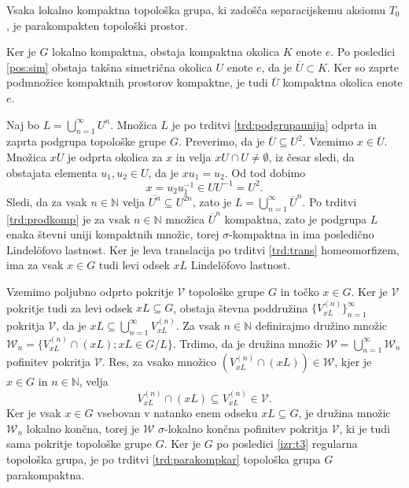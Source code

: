 \documentclass[mat1]{fmfdelo}
\newcommand{\N}{\mathbb N}
\newcommand{\closure}[1]{\overline{#1}}
\begin{document}
\begin{izrek}\label{izr:t4}
	Vsaka lokalno kompaktna topološka grupa, ki zadošča separacijskemu aksiomu $T_0$, je parakompakten topološki prostor.
\end{izrek}

\begin{dokaz}
Ker je $G$ lokalno kompaktna, obstaja kompaktna okolica $K$ enote $e$. Po posledici \ref{pos:sim} obstaja takšna simetrična okolica $U$ enote $e$, da je $\closure{U} \subset K$. Ker so zaprte podmnožice kompaktnih prostorov kompaktne, je tudi $\closure{U}$ kompaktna okolica enote $e$.

Naj bo $L = \bigcup_{n=1}^\infty U^n$. Množica $L$ je po trditvi \ref{trd:podgrupaunija} odprta in zaprta podgrupa topološke grupe $G$.
Preverimo, da je $\closure{U} \subseteq U^2$. Vzemimo $x \in \closure{U}$. Množica $xU$ je odprta okolica za $x$ in velja $xU \cap U \neq \emptyset$, iz česar sledi, da obstajata elementa $u_1,u_2 \in U$, da je $xu_1 = u_2$. Od tod dobimo
\[ x = u_2u_1^{-1} \in UU^{-1} = U^2. \]
Sledi, da za vsak $n \in \N$ velja $\closure{U^n} \subseteq U^{2n}$, zato je $L = \bigcup_{n=1}^\infty \closure{U}^n$. Po trditvi \ref{trd:prodkomp} je za vsak $n \in \N$ množica $\closure{U}^n$ kompaktna, zato je podgrupa $L$ enaka števni uniji kompaktnih množic, torej $\sigma$-kompaktna in ima posledično Lindel\"ofovo lastnost. Ker je leva translacija po trditvi \ref{trd:trans} homeomorfizem, ima za vsak $x \in G$ tudi levi odsek $xL$ Lindel\"ofovo lastnost.

Vzemimo poljubno odprto pokritje $\mathcal{V}$ topološke grupe $G$ in točko $x \in G$.
Ker je $\mathcal{V}$ pokritje tudi za levi odsek $xL \subseteq G$, obstaja števna poddružina $\lbrace V_{xL}^{(n)} \rbrace_{n = 1}^{\infty}$ pokritja $\mathcal{V}$, da je $xL \subseteq \bigcup_{n=1}^{\infty}V_{xL}^{(n)}$. Za vsak $n \in \N$ definirajmo družino množic $\mathcal{W}_n = \lbrace V_{xL}^{(n)} \cap (xL) ; xL \in G/L \rbrace$.
Trdimo, da je družina množic $\mathcal{W} = \bigcup_{n=1}^{\infty}\mathcal{W}_n$ pofinitev pokritja $\mathcal{V}$. Res, za vsako množico $(V_{xL}^{(n)} \cap (xL)) \in \mathcal{W}$, kjer je $x \in G$ in $n \in \N$, velja
\[ V_{xL}^{(n)} \cap (xL) \subseteq V_{xL}^{(n)} \in \mathcal{V}. \]
Ker je vsak $x \in G$ vsebovan v natanko enem odseku $xL \subseteq G$, je družina množic $\mathcal{W}_n$ lokalno končna, torej je $\mathcal{W}$ $\sigma$-lokalno končna pofinitev pokritja $\mathcal{V}$, ki je tudi sama pokritje topološke grupe $G$. Ker je $G$ po posledici \ref{izr:t3} regularna topološka grupa, je po trditvi \ref{trd:parakompkar} topološka grupa $G$ parakompaktna.
\end{dokaz}
\end{document}
